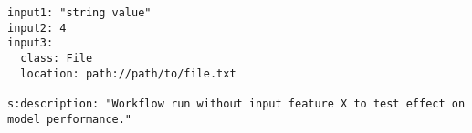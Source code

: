 \begin{verbatim}
input1: "string value"
input2: 4
input3:
  class: File
  location: path://path/to/file.txt

s:description: "Workflow run without input feature X to test effect on model performance."
\end{verbatim}